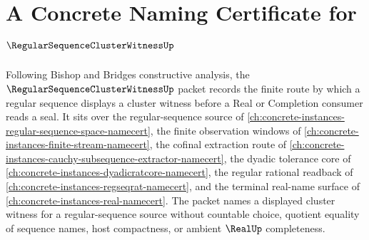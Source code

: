\chapter{A Concrete Naming Certificate for $\RegularSequenceClusterWitnessUp$}
\label{ch:concrete-instances-regular-sequence-cluster-witness-namecert}

Following Bishop and Bridges constructive analysis, the $\RegularSequenceClusterWitnessUp$ packet records the finite route by which a regular sequence displays a cluster witness before a Real or Completion consumer reads a seal. It sits over the regular-sequence source of \autoref{ch:concrete-instances-regular-sequence-space-namecert}, the finite observation windows of \autoref{ch:concrete-instances-finite-stream-namecert}, the cofinal extraction route of \autoref{ch:concrete-instances-cauchy-subsequence-extractor-namecert}, the dyadic tolerance core of \autoref{ch:concrete-instances-dyadicratcore-namecert}, the regular rational readback of \autoref{ch:concrete-instances-regseqrat-namecert}, and the terminal real-name surface of \autoref{ch:concrete-instances-real-namecert}. The packet names a displayed cluster witness for a regular-sequence source without countable choice, quotient equality of sequence names, host compactness, or ambient $\RealUp$ completeness.

